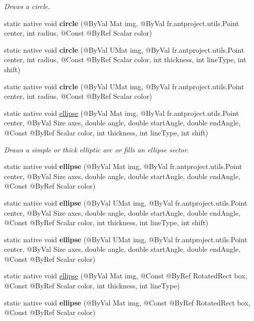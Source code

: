 \begin{DoxyCompactItemize}
\begin{DoxyCompactList}\small\item\em Draws a circle. \end{DoxyCompactList}\item 
static native void {\bfseries circle} (@By\+Val Mat img, @By\+Val fr.antproject.utils.Point center, int radius, @Const @By\+Ref Scalar color)
\item 
static native void {\bfseries circle} (@By\+Val U\+Mat img, @By\+Val fr.antproject.utils.Point center, int radius, @Const @By\+Ref Scalar color, int thickness, int line\+Type, int shift)
\item 
static native void {\bfseries circle} (@By\+Val U\+Mat img, @By\+Val fr.antproject.utils.Point center, int radius, @Const @By\+Ref Scalar color)
\item 
static native void \hyperlink{group__imgproc__draw_ga775ad50d707d4e99bd6f123f702e55a2}{ellipse} (@By\+Val Mat img, @By\+Val fr.antproject.utils.Point center, @By\+Val Size axes, double angle, double start\+Angle, double end\+Angle, @Const @By\+Ref Scalar color, int thickness, int line\+Type, int shift)
\begin{DoxyCompactList}\small\item\em Draws a simple or thick elliptic arc or fills an ellipse sector. \end{DoxyCompactList}\item 
static native void {\bfseries ellipse} (@By\+Val Mat img, @By\+Val fr.antproject.utils.Point center, @By\+Val Size axes, double angle, double start\+Angle, double end\+Angle, @Const @By\+Ref Scalar color)
\item 
static native void {\bfseries ellipse} (@By\+Val U\+Mat img, @By\+Val fr.antproject.utils.Point center, @By\+Val Size axes, double angle, double start\+Angle, double end\+Angle, @Const @By\+Ref Scalar color, int thickness, int line\+Type, int shift)
\item 
static native void {\bfseries ellipse} (@By\+Val U\+Mat img, @By\+Val fr.antproject.utils.Point center, @By\+Val Size axes, double angle, double start\+Angle, double end\+Angle, @Const @By\+Ref Scalar color)
\item 
static native void \hyperlink{group__imgproc__draw_gad8f98cdfda176a2e4e1560740c6b5adb}{ellipse} (@By\+Val Mat img, @Const @By\+Ref Rotated\+Rect box, @Const @By\+Ref Scalar color, int thickness, int line\+Type)
\item 
static native void {\bfseries ellipse} (@By\+Val Mat img, @Const @By\+Ref Rotated\+Rect box, @Const @By\+Ref Scalar color)

\end{DoxyCompactItemize}
